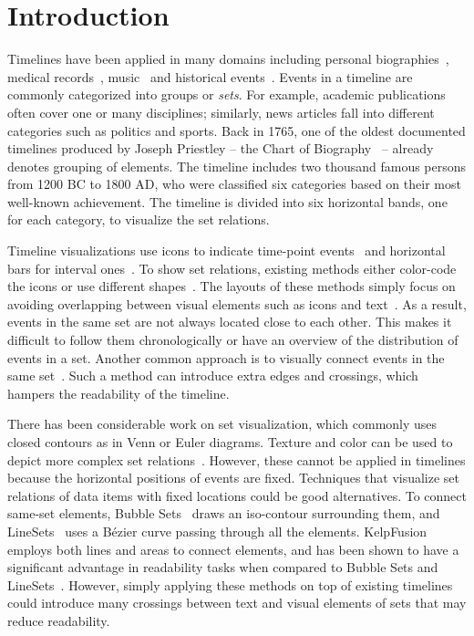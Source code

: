 \section{Introduction}
Timelines have been applied in many domains including personal biographies~\cite{Plaisant1996},  medical records~\cite{Plaisant1998}, music~\cite{Andre2007} and historical events~\cite{Rosenberg2013}. Events in a timeline are commonly categorized into groups or \textit{sets}. For example, academic publications often cover one or many disciplines; similarly, news articles fall into different categories such as politics and sports. Back in 1765, one of the oldest documented timelines produced by Joseph Priestley -- the Chart of Biography~\cite{Priestley1765} -- already denotes grouping of elements. The timeline includes two thousand famous persons from 1200 BC to 1800 AD, who were classified six categories based on their most well-known achievement. The timeline is divided into six horizontal bands, one for each category, to visualize the set relations.

Timeline visualizations use icons to indicate time-point events~\cite{SimileTimeline2009} and horizontal bars for interval ones~\cite{Plaisant1996}. To show set relations, existing methods either color-code the icons or use different shapes~\cite{TimeGlider2016}. The layouts of these methods simply focus on avoiding overlapping between visual elements such as icons and text~\cite{SimileTimeline2009,TimeGlider2016}. As a result, events in the same set are not always located close to each other. This makes it difficult to follow them chronologically or have an overview of the distribution of events in a set. Another common approach is to visually connect events in the same set~\cite{Kumar1998}. Such a method can introduce extra edges and crossings, which hampers the readability of the timeline. 

There has been considerable work on set visualization, which commonly uses closed contours as in Venn or Euler diagrams. Texture and color can be used to depict more complex set relations~\cite{Ware2013}. However, these cannot be applied in timelines because the horizontal positions of events are fixed. Techniques that visualize set relations of data items with fixed locations could be good alternatives. To connect same-set elements, Bubble Sets~\cite{Collins2009a} draws an iso-contour surrounding them, and LineSets~\cite{Alper2011} uses a B\'{e}zier curve passing through all the elements. KelpFusion employs both lines and areas to connect elements, and has been shown to have a significant advantage in readability tasks when compared to Bubble Sets and LineSets~\cite{Meulemans2013}. However, simply applying these methods on top of existing timelines could introduce many crossings between text and visual elements of sets that may reduce readability.

